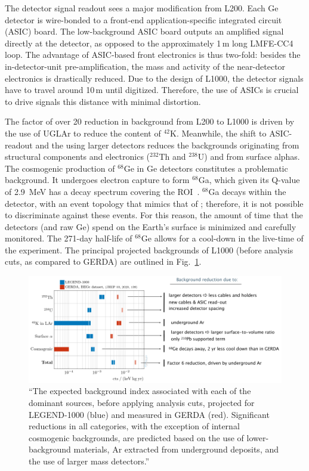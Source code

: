 The detector signal readout sees a major modification from L200. Each Ge detector is wire-bonded to a front-end application-specific integrated circuit (ASIC) board. The low-background ASIC board outputs an amplified signal directly at the detector, as opposed to the approximately 1\,m long LMFE-CC4 loop. The advantage of ASIC-based front electronics is thus two-fold: besides the in-detector-unit pre-amplification, the mass and activity of the near-detector electronics is drastically reduced. Due to the design of L1000, the detector signals have to travel around 10\,m until digitized. Therefore, the use of ASICs is crucial to drive signals this distance with minimal distortion. 

The factor of over 20 reduction in background from L200 to L1000 is driven by the use of UGLAr to reduce the content of $^{42}$K. Meanwhile, the shift to ASIC-readout and the using larger detectors reduces the backgrounds originating from structural components and electronics ($^{232}$Th and $^{238}$U) and from surface alphas. The cosmogenic production of $^{68}$Ge in Ge detectors constitutes a problematic background. It undergoes electron capture to form $^{68}$Ga, which given its Q-value of 2.9\, MeV has a decay spectrum covering the \novbb{} ROI~\cite{mjd_muonic}. $^{68}$Ga decays within the detector, with an event topology that mimics that of \novbb{}; therefore, it is not possible to discriminate against these events. For this reason, the amount of time that the detectors (and raw Ge) spend on the Earth's surface is minimized and carefully monitored. The 271-day half-life of $^{68}$Ge allows for a cool-down in the live-time of the experiment. The principal projected backgrounds of L1000 (before analysis cuts, as compared to GERDA) are outlined in Fig.~\ref{fig:legend_background}. 
\begin{figure}[htb]
	\centering
	\includegraphics[width=6in]{figs/legend/legend_background.pdf}
	\caption{``The expected background index associated with each of the dominant sources, before applying analysis cuts, projected for LEGEND-1000 (blue) and measured in GERDA (red). Significant reductions in all categories, with the exception of internal cosmogenic backgrounds, are predicted based on the use of lower-background materials, Ar extracted from underground deposits, and the use of larger mass detectors.''~\cite{legend_pcdr}}
	\label{fig:legend_background}
\end{figure}

